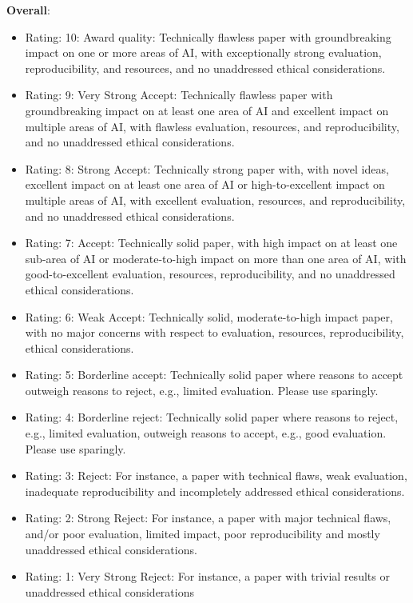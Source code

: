 \documentclass{article}
\begin{document}
\textbf{Overall}:
\begin{itemize}
  \item Rating: 10: Award quality: Technically flawless paper with groundbreaking impact on one or more areas of AI, with exceptionally strong evaluation, reproducibility, and resources, and no unaddressed ethical considerations.
  \item Rating: 9: Very Strong Accept: Technically flawless paper with groundbreaking impact on at least one area of AI and excellent impact on multiple areas of AI, with flawless evaluation, resources, and reproducibility, and no unaddressed ethical considerations.
  \item Rating: 8: Strong Accept: Technically strong paper with, with novel ideas, excellent impact on at least one area of AI or high-to-excellent impact on multiple areas of AI, with excellent evaluation, resources, and reproducibility, and no unaddressed ethical considerations.
  \item Rating: 7: Accept: Technically solid paper, with high impact on at least one sub-area of AI or moderate-to-high impact on more than one area of AI, with good-to-excellent evaluation, resources, reproducibility, and no unaddressed ethical considerations.
  \item Rating: 6: Weak Accept: Technically solid, moderate-to-high impact paper, with no major concerns with respect to evaluation, resources, reproducibility, ethical considerations.
  \item Rating: 5: Borderline accept: Technically solid paper where reasons to accept outweigh reasons to reject, e.g., limited evaluation. Please use sparingly.
  \item Rating: 4: Borderline reject: Technically solid paper where reasons to reject, e.g., limited evaluation, outweigh reasons to accept, e.g., good evaluation. Please use sparingly.
  \item Rating: 3: Reject: For instance, a paper with technical flaws, weak evaluation, inadequate reproducibility and incompletely addressed ethical considerations.
  \item Rating: 2: Strong Reject: For instance, a paper with major technical flaws, and/or poor evaluation, limited impact, poor reproducibility and mostly unaddressed ethical considerations.
  \item Rating: 1: Very Strong Reject: For instance, a paper with trivial results or unaddressed ethical considerations
\end{itemize}
\end{document}
